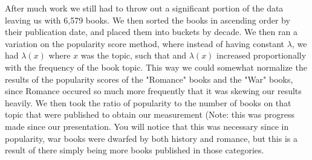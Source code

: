 \documentclass[twoside]{article}
\begin{document}
\begin{multicols}{2}
After much work we still had to throw out a significant portion of the data leaving us with 6,579 books. We then sorted the books in ascending order by their publication date, and placed them into buckets by decade. We then ran a variation on the popularity score method, where instead of having constant $\lambda$, we had $\lambda(x)$ where $x$ was the topic, such that and $\lambda(x)$ increased proportionally with the frequency of the book topic. This way we could somewhat normalize the results of the popularity scores of the "Romance" books and the "War" books, since Romance occured so much more frequently that it was skewing our results heavily. We then took the ratio of popularity to the number of books on that topic that were published to obtain our measurement (Note: this was progress made since our presentation. You will notice that this was necessary since in popularity, war books were dwarfed by both history and romance, but this is a result of there simply being more books published in those categories.
\end{multicols}
\newpage
\end{document}
